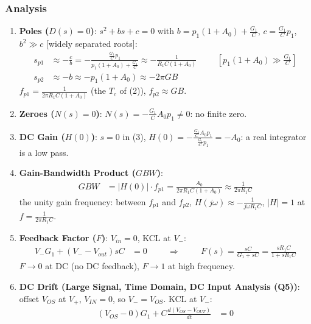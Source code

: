 \subsubsection{Analysis}
\begin{enumerate}
  \item \textbf{Poles (\(D(s) = 0\))}: \(s^2 + b s + c = 0\) with
    \(b = p_1(1 + A_0) + \frac{G_1}{C}\), \(c = \frac{G_1}{C} p_1\), \(b^2 \gg c\) [widely
    separated roots]:
    \begin{align*}
      s_{p1} &\approx -\frac{c}{b} = -\frac{\frac{G_1}{C} p_1}{p_1(1 + A_0) + \frac{G_1}{C}} \approx -\frac{1}{R_1 C(1 + A_0)} \hspace{1cm} [p_1(1 + A_0) \gg \tfrac{G_1}{C}] \\
      s_{p2} &\approx -b \approx -p_1(1 + A_0) \approx -2\pi GB
    \end{align*}
    \(f_{p1} = \frac{1}{2\pi R_1 C(1 + A_0)}\) (the \(T_c\) of (2)), \(f_{p2} \approx GB\).
  \item \textbf{Zeroes (\(N(s) = 0\))}: \(N(s) = -\frac{G_1}{C} A_0 p_1 \neq 0\): no finite zero.
  \item \textbf{DC Gain (\(H(0)\))}: \(s = 0\) in (3),
    \(H(0) = -\frac{\frac{G_1}{C} A_0 p_1}{\frac{G_1}{C} p_1} = -A_0\): a real integrator is a low pass.
  \item \textbf{Gain-Bandwidth Product (\(GBW\))}:
    \begin{align*}
      GBW &= |H(0)| \cdot f_{p1} = \frac{A_0}{2\pi R_1 C(1 + A_0)} \approx \frac{1}{2\pi R_1 C}
    \end{align*}
    the unity gain frequency: between \(f_{p1}\) and \(f_{p2}\),
    \(H(j\omega) \approx -\frac{1}{j\omega R_1 C}\), \(|H| = 1\) at \(f = \frac{1}{2\pi R_1 C}\).
  \item \textbf{Feedback Factor (\(F\))}: \(V_{in} = 0\), KCL at \(V_-\):
    \begin{align*}
      V_- G_1 + (V_- - V_{out}) sC &= 0 \hspace{1cm} \Rightarrow \hspace{1cm} F(s) = \frac{sC}{G_1 + sC} = \frac{s R_1 C}{1 + s R_1 C}
    \end{align*}
    \(F \to 0\) at DC (no DC feedback), \(F \to 1\) at high frequency.
  \item \textbf{DC Drift (Large Signal, Time Domain, DC Input Analysis (Q5))}: offset
    \(V_{OS}\) at \(V_+\), \(V_{IN} = 0\), so \(V_- = V_{OS}\). KCL at \(V_-\):
    \begin{align*}
      (V_{OS} - 0) G_1 + C\frac{d(V_{OS} - V_{OUT})}{dt} &= 0 \\

\end{align*}
\end{enumerate}

